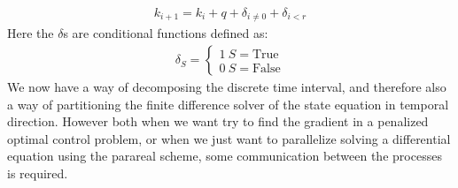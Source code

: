 \begin{align*}
k_{i+1} = k_i + q+\delta_{i\neq0}+\delta_{i<r}
\end{align*}
Here the $\delta$s are conditional functions defined as:
\begin{align*}
\delta_{S}=\left\{
     \begin{array}{lr}
		1 \ S=\text{True} \\
		0 \ S=\text{False}
	\end{array}
   \right.	
\end{align*} 
We now have a way of decomposing the discrete time interval, and therefore also a way of partitioning the finite difference solver of the state equation in temporal direction. However both when we want try to find the gradient in a penalized optimal control problem, or when we just want to parallelize solving a differential equation using the parareal scheme, some communication between the processes is required. 
